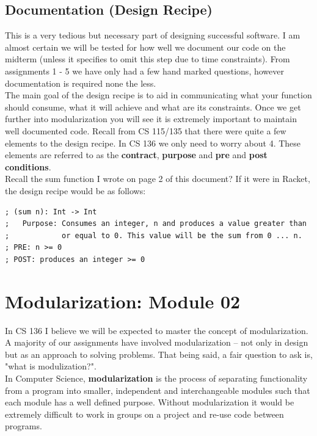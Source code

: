 \documentclass[12pt,extarticle]{article}
\begin{document}
\subsection{Documentation (Design Recipe)}

This is a very tedious but necessary part of designing successful software. I am almost certain we will be tested for how well we document our code on the midterm (unless it specifies to omit this step due to time constraints). From assignments 1 - 5 we have only had a few hand marked questions, however documentation is required none the less.\\

The main goal of the design recipe is to aid in communicating what your function should consume, what it will achieve and what are its constraints. Once we get further into modularization you will see it is extremely important to maintain well documented code. Recall from CS 115/135 that there were quite a few elements to the design recipe. In CS 136 we only need to worry about 4. These elements are referred to as the \textbf{contract}, \textbf{purpose} and \textbf{pre} and \textbf{post conditions}.\\

Recall the sum function I wrote on page 2 of this document? If it were in Racket, the design recipe would be as follows:\\

\lstset {
	language=Lisp
}
\begin{lstlisting}
; (sum n): Int -> Int
;	Purpose: Consumes an integer, n and produces a value greater than
;	         or equal to 0. This value will be the sum from 0 ... n.
; PRE: n >= 0
; POST: produces an integer >= 0
\end{lstlisting}

\newpage
\section{Modularization: Module 02}
In CS 136 I believe we will be expected to master the concept of modularization. A majority of our assignments have involved modularization -- not only in design but as an approach to solving problems. That being said, a fair question to ask is, "what is modulization?".\\

In Computer Science, \textbf{modularization} is the process of separating functionality from a program into smaller, independent and interchangeable modules such that each module has a well defined purpose. Without modularization it would be extremely difficult to work in groups on a project and re-use code between programs.\\
\end{document}
